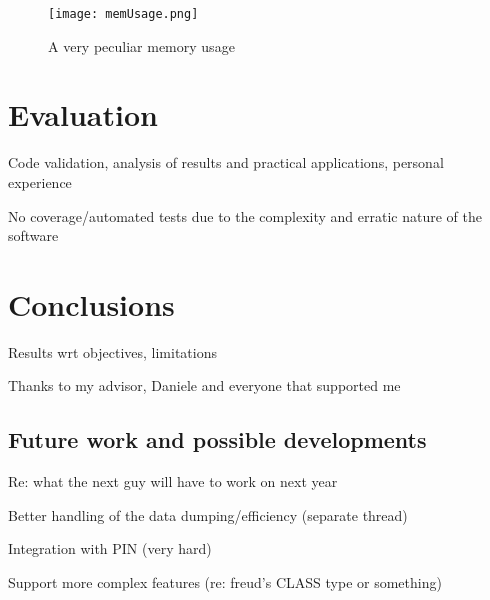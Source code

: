         \begin{figure}[H]
            \centering
            \texttt{[image: memUsage.png]}
            \caption{A very peculiar memory usage}
            \label{fig:memUsage}
        \end{figure}


\chapter{Evaluation}

    Code validation, analysis of results and practical applications, personal experience

    No coverage/automated tests due to the complexity and erratic nature of the software


\chapter{Conclusions}

    Results wrt objectives, limitations

    Thanks to my advisor, Daniele and everyone that supported me

	\section{Future work and possible developments}

        Re: what the next guy will have to work on next year

        Better handling of the data dumping/efficiency (separate thread)

        Integration with PIN (very hard)

        Support more complex features (re: freud's CLASS type or something)
